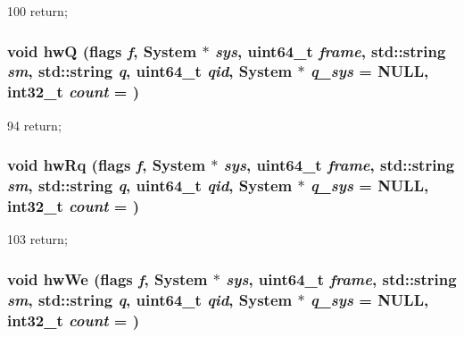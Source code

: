 \begin{DoxyCode}
100                                                                   { return; }
\end{DoxyCode}
\hypertarget{classCPA_a31614725ede04f43ff983d5dedb56590}{
\subsubsection[{hwQ}]{\setlength{\rightskip}{0pt plus 5cm}void hwQ ({\bf flags} {\em f}, \/  {\bf System} $\ast$ {\em sys}, \/  uint64\_\-t {\em frame}, \/  std::string {\em sm}, \/  std::string {\em q}, \/  uint64\_\-t {\em qid}, \/  {\bf System} $\ast$ {\em q\_\-sys} = {\ttfamily NULL}, \/  int32\_\-t {\em count} = {})}}
\label{classCPA_a31614725ede04f43ff983d5dedb56590}



\begin{DoxyCode}
94                                                                   { return; }
\end{DoxyCode}
\hypertarget{classCPA_abfcac9cc80c2bd60bafb7da3f6669ba6}{
\subsubsection[{hwRq}]{\setlength{\rightskip}{0pt plus 5cm}void hwRq ({\bf flags} {\em f}, \/  {\bf System} $\ast$ {\em sys}, \/  uint64\_\-t {\em frame}, \/  std::string {\em sm}, \/  std::string {\em q}, \/  uint64\_\-t {\em qid}, \/  {\bf System} $\ast$ {\em q\_\-sys} = {\ttfamily NULL}, \/  int32\_\-t {\em count} = {})}}
\label{classCPA_abfcac9cc80c2bd60bafb7da3f6669ba6}



\begin{DoxyCode}
103                                                                   { return; }
\end{DoxyCode}
\hypertarget{classCPA_a5b3ce310c0911ec7bca22bc32f243cb9}{
\subsubsection[{hwWe}]{\setlength{\rightskip}{0pt plus 5cm}void hwWe ({\bf flags} {\em f}, \/  {\bf System} $\ast$ {\em sys}, \/  uint64\_\-t {\em frame}, \/  std::string {\em sm}, \/  std::string {\em q}, \/  uint64\_\-t {\em qid}, \/  {\bf System} $\ast$ {\em q\_\-sys} = {\ttfamily NULL}, \/  int32\_\-t {\em count} = {})}}
\label{classCPA_a5b3ce310c0911ec7bca22bc32f243cb9}



